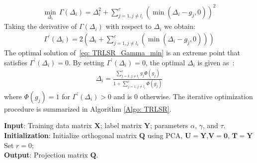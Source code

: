 %
\begin{align}
    \label{eq: TRLSR_Gamma_min}
     \min_{\Delta_{i}}\, \Gamma (\Delta_{i}) = \Delta_{i}^{2} + \sum_{j=1,j \neq l_{i}}^{c} \left(\min (\Delta_{i} - g_{j}, 0)\right)^{2} 
\end{align}
%
Taking the derivative of $\Gamma (\Delta_{i})$ with respect to $\Delta_{i}$ we obtain: 
%
\begin{align}
   \label{eq: TRLSRGamma_derivative}
    \Gamma^{\prime} (\Delta_{i}) = 2 \left(\Delta_{i} + \sum_{j=1,j \neq l_{i}}^{c} (\min (\Delta_{i} - g_{j}, 0)) \right)
\end{align}
%
The optimal solution of~\eqref{eq: TRLSR_Gamma_min} is an extreme point that satisfies $\Gamma^{\prime} (\Delta_{i}) = 0$. By setting $\Gamma^{\prime} (\Delta_{i})=0$, the optimal $\Delta_{i}$ is given as~\cite{ReLSR}:
%
\begin{align}
    \label{eq: TRLSR_Optimal_Delta}
    \Delta_{i} = \frac{\sum_{j=1,j \neq l_{i}}^{c} g_{j} \Phi(g_{j})}{1 + \sum_{j=1,j \neq l_{i}}^{c} \Phi(g_{j})}
\end{align}
%
where $\Phi(g_{j}) = 1$ for $\Gamma^{\prime}(\Delta_{i}) > 0$ and is $0$ otherwise. The iterative optimization procedure is summarized in Algorithm \ref{Algo: TRLSR}.
\begin{algorithm}
\SetAlgoLined
\textbf{Input}: Training data matrix $\bm{X}$; label matrix $\bm{Y}$; parameters $\alpha$, $\gamma$, and $\tau$.\\
\textbf{Initialization}: Initialize orthogonal matrix $\bm{Q}$ using PCA, $\bm{U}=\bm{Y}$,$\bm{V}=\bm{0}$, $\bm{T} = \bm{Y}$\\
Set $r = 0$; \\
\textbf{Output}: Projection matrix $\bm{Q}$.
\caption{TRLSR framework}
\label{Algo: TRLSR}
\end{algorithm}


